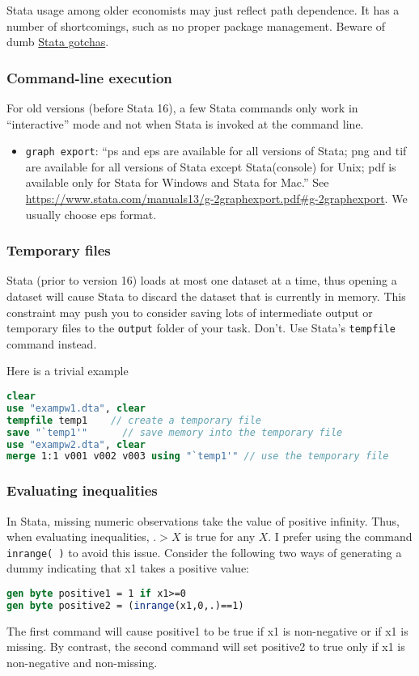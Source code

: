 Stata usage among older economists may just reflect path dependence.
It has a number of shortcomings, such as no proper package management.
Beware of dumb \href{https://ifs.org.uk/sites/default/files/output_url_files/stata_gotchasJan2014.pdf}{Stata gotchas}.

\subsubsection{Command-line execution}

For old versions (before Stata 16), a few Stata commands only work in ``interactive'' mode and not when Stata is invoked at the command line.
\begin{itemize}
	\item \texttt{graph export}:
	``ps and eps are available for all versions of Stata; png and tif are available for all versions of Stata except Stata(console) for Unix; pdf is available only for Stata for Windows and Stata for Mac.''
	See \url{https://www.stata.com/manuals13/g-2graphexport.pdf#g-2graphexport}.
	We usually choose eps format.
\end{itemize}


\subsubsection{Temporary files}
Stata (prior to version 16) loads at most one dataset at a time,
thus opening a dataset will cause Stata to discard the dataset that is currently in memory.
This constraint may push you to consider saving lots of intermediate output or temporary files to the \texttt{output} folder of your task.
Don't.
Use Stata's \texttt{tempfile} command instead.

Here is a trivial example
\begin{lstlisting}[language=Stata]
clear
use "exampw1.dta", clear
tempfile temp1    // create a temporary file
save "`temp1'"      // save memory into the temporary file
use "exampw2.dta", clear
merge 1:1 v001 v002 v003 using "`temp1'" // use the temporary file
\end{lstlisting}

\subsubsection{Evaluating inequalities}
In Stata, missing numeric observations take the value of positive infinity.
Thus, when evaluating inequalities, $.>X$ is true for any $X$.
I prefer using the command \texttt{inrange( )} to avoid this issue.
Consider the following two ways of generating a dummy indicating that x1 takes a positive value:
\begin{lstlisting}[language=Stata]
gen byte positive1 = 1 if x1>=0
gen byte positive2 = (inrange(x1,0,.)==1)
\end{lstlisting}
The first command will cause positive1 to be true if x1 is non-negative or if x1 is missing.
By contrast, the second command will set positive2 to true only if x1 is non-negative and non-missing.

